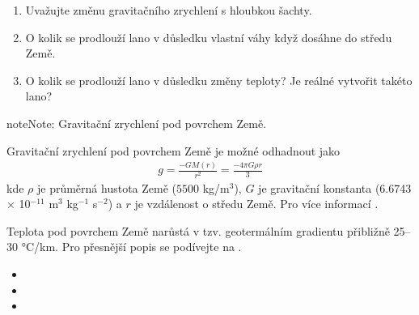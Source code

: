 \documentclass[letterpaper,10pt,english]{jupyterBook}
\begin{document}
{{\begin{enumerate}
\begin{enumerate}
\item {} 
\sphinxAtStartPar
Uvažujte změnu gravitačního zrychlení s hloubkou šachty.

\item {} 
\sphinxAtStartPar
O kolik se prodlouží lano v důsledku vlastní váhy když dosáhne do středu Země.

\item {} 
\sphinxAtStartPar
O kolik se prodlouží lano v důsledku změny teploty? Je reálné vytvořit takéto lano?

\end{enumerate}

\end{enumerate}

\begin{sphinxadmonition}{note}{Note:}
\sphinxAtStartPar
Gravitační zrychlení pod povrchem Země.

\sphinxAtStartPar
Gravitační zrychlení pod povrchem Země je možné odhadnout jako
\begin{equation*}
\begin{split}g = \frac{-G M(r)}{r^2} = \frac{- 4 \pi G \rho r}{3} \end{split}
\end{equation*}
\sphinxAtStartPar
kde \(\rho\) je průměrná hustota Země (\(5500 \) kg/m\(^3\)), \(G\) je gravitační konstanta (6.6743 × 10\(^{-11}\) m\(^3\) kg\(^{-1}\) s\(^{-2}\)) a \(r\) je vzdálenost o středu Země. Pro více informací .

\sphinxAtStartPar
Teplota pod povrchem Země narůstá v tzv. geotermálním gradientu přibližně 25–30 °C/km. Pro přesnější popis se podívejte na .
\end{sphinxadmonition}
\begin{itemize}
\item {} 
\sphinxAtStartPar
{}

\item {} 
\sphinxAtStartPar
{}

\item {} 
\sphinxAtStartPar
{}


\end{itemize}}}
\end{document}
